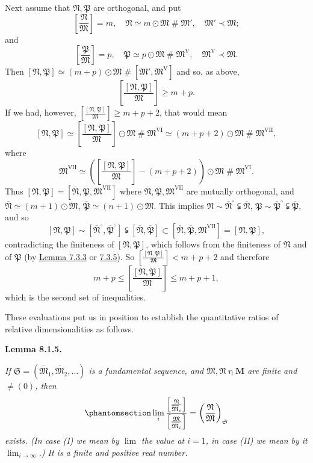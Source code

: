 \documentclass[12pt,b5paper,twoside]{article}
\newcommand{\M}{\mathbf M}
\newcommand{\reldiv}[2]{\left[\frac{#1}{#2}\right]}
\newcommand{\Lemma}[1]{%
  \par\smallskip\noindent\phantomsection\label{lem:#1}\textbf{Lemma #1.}\enspace
}
\newcommand{\lemref}[1]{\hyperref[lem:#1]{Lemma #1}}
\begin{document}
Next assume that $\mathfrak N,\mathfrak P$ are orthogonal, and put
\[
 \reldiv{\mathfrak N}{\mathfrak M}=m,
 \quad \mathfrak N\simeq m\odot\mathfrak M\mathbin{\#}\mathfrak M',
 \quad \mathfrak M'\prec\mathfrak M;
\]
and
\[
 \reldiv{\mathfrak P}{\mathfrak M}=p,
 \quad \mathfrak P\simeq p\odot\mathfrak M\mathbin{\#}\mathfrak M^{\mathrm V},
 \quad \mathfrak M^{\mathrm V}\prec\mathfrak M.
\]
Then
$[\mathfrak N,\mathfrak P]\simeq(m+p)\odot\mathfrak M
\mathbin{\#}[\mathfrak M',\mathfrak M^{\mathrm V}]$ and so, as above,
\[
 \reldiv{[\mathfrak N,\mathfrak P]}{\mathfrak M}\geq m+p.
\]
If we had, however,
$\reldiv{[\mathfrak N,\mathfrak P]}{\mathfrak M}\geq m+p+2$, that would mean
\[
 [\mathfrak N,\mathfrak P]\simeq
 \reldiv{[\mathfrak N,\mathfrak P]}{\mathfrak M}\odot\mathfrak M
 \mathbin{\#}\mathfrak M^{\mathrm{VI}}
 \simeq(m+p+2)\odot\mathfrak M\mathbin{\#}\mathfrak M^{\mathrm{VII}},
\]
where
\[
 \mathfrak M^{\mathrm{VII}}\simeq
 \left(\reldiv{[\mathfrak N,\mathfrak P]}{\mathfrak M}-(m+p+2)\right)
 \odot\mathfrak M\mathbin{\#}\mathfrak M^{\mathrm{VI}}.
\]
Thus
$[\mathfrak N,\mathfrak P]=[\overline{\mathfrak N},
\overline{\mathfrak P},\mathfrak M^{\mathrm{VII}}]$ where
$\overline{\mathfrak N},\overline{\mathfrak P},\mathfrak M^{\mathrm{VII}}$
are mutually orthogonal, and
$\overline{\mathfrak N}\simeq(m+1)\odot\mathfrak M$,
$\overline{\mathfrak P}\simeq(n+1)\odot\mathfrak M$. This implies
$\mathfrak N\sim\overline{\mathfrak N}^{\circ}
\subsetneqq\overline{\mathfrak N}$,
$\mathfrak P\sim\overline{\mathfrak P}^{\circ}
\subsetneqq\overline{\mathfrak P}$, and so
\[
 [\mathfrak N,\mathfrak P]
 \sim[\overline{\mathfrak N}^{\circ},\overline{\mathfrak P}^{\circ}]
 \subsetneqq[\overline{\mathfrak N},\overline{\mathfrak P}]
 \subset[\overline{\mathfrak N},\overline{\mathfrak P},
 \mathfrak M^{\mathrm{VII}}]=[\mathfrak N,\mathfrak P],
\]
contradicting the finiteness of $[\mathfrak N,\mathfrak P]$, which follows from
the finiteness of $\mathfrak N$ and of $\mathfrak P$ (by \lemref{7.3.3} or
\hyperref[lem:7.3.5]{7.3.5}). So
$\reldiv{[\mathfrak N,\mathfrak P]}{\mathfrak M}<m+p+2$ and therefore
\[
 m+p\leq\reldiv{[\mathfrak N,\mathfrak P]}{\mathfrak M}\leq m+p+1,
\]
which is the second set of inequalities.

These evaluations put us in position to establish the quantitative ratios of
relative dimensionalities as follows.

\Lemma{8.1.5}
{\itshape
If $\mathfrak S=(\overline{\mathfrak M}_1,\overline{\mathfrak M}_2,\ldots)$
is a fundamental sequence, and $\mathfrak M,\mathfrak N\mathbin\eta\M$ are
finite and $\ne(0)$, then
\begin{equation*}
 \phantomsection\label{eq:8.1.1}
 \lim_i
 \frac{\reldiv{\mathfrak N}{\overline{\mathfrak M}_i}}
      {\reldiv{\mathfrak M}{\overline{\mathfrak M}_i}}
 =\left(\frac{\mathfrak N}{\mathfrak M}\right)_{\mathfrak S}
\end{equation*}
exists. (In case (I) we mean by $\lim$ the value at $i=1$, in case (II) we mean
by it $\lim_{i\to\infty}$.) It is a finite and positive real number.}
\end{document}
